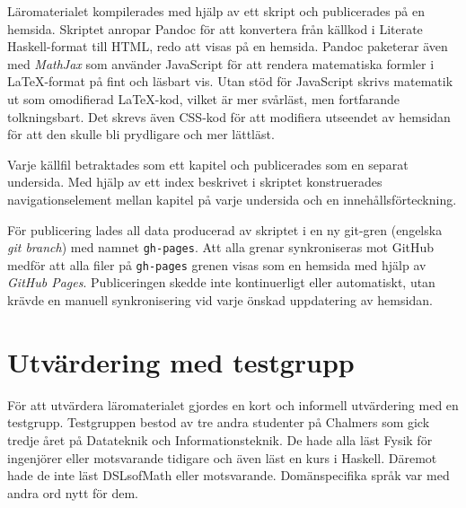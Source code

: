 Läromaterialet kompilerades med hjälp av ett skript och
publicerades på en hemsida. Skriptet anropar
Pandoc för att konvertera från källkod i Literate
Haskell-format till HTML, redo att visas på en hemsida. Pandoc
paketerar även med \textit{MathJax} som använder JavaScript för att
rendera matematiska formler i LaTeX-format på fint och läsbart
vis. Utan stöd för JavaScript skrivs matematik ut som omodifierad
LaTeX-kod, vilket är mer svårläst, men fortfarande tolkningsbart. Det
skrevs även CSS-kod för att modifiera utseendet av
hemsidan för att den skulle bli prydligare och mer lättläst.

Varje källfil betraktades som ett kapitel och publicerades som en
separat undersida. Med hjälp av ett index beskrivet i skriptet
konstruerades navigationselement mellan kapitel på varje undersida
och en innehållsförteckning.

För publicering lades all data producerad av skriptet i en ny git-gren (engelska \textit{git branch}) med namnet \texttt{gh-pages}. Att alla grenar synkroniseras
mot GitHub medför att alla filer på \texttt{gh-pages} grenen
visas som en hemsida med hjälp av \textit{GitHub
  Pages}. Publiceringen skedde inte kontinuerligt eller automatiskt,
utan krävde en manuell synkronisering vid varje önskad uppdatering av
hemsidan.

\section{Utvärdering med testgrupp}


För att utvärdera läromaterialet gjordes en kort och informell utvärdering med
en testgrupp. Testgruppen bestod av tre andra studenter på Chalmers som gick
tredje året på Datateknik och Informationsteknik. De hade alla läst Fysik för
ingenjörer eller motsvarande tidigare och även läst en kurs i Haskell.
Däremot hade de inte läst DSLsofMath eller motsvarande. Domänspecifika språk var
med andra ord nytt för dem.

